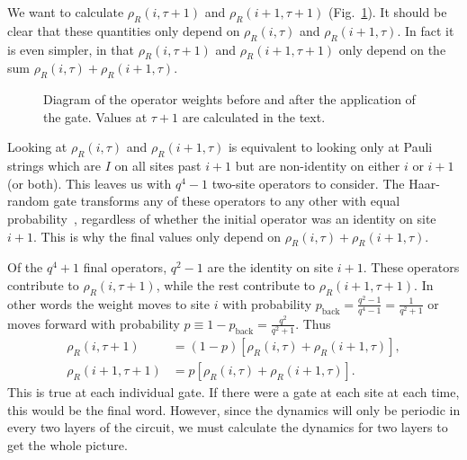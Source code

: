 \documentclass[a4paper,11pt]{article}
\renewcommand{\th}[1]{\frac{1}{#1}}
\renewcommand{\t}{\tau}
\newcommand{\nn}{\nonumber\\}
\begin{document}
We want to calculate $\rho_R(i,\tau+1)$ and $\rho_R(i+1, \tau+1)$ (Fig.~\ref{fig:2sites}). It should be clear that these quantities only depend on $\rho_R(i,\tau)$ and $\rho_R(i+1, \tau)$. In fact it is even simpler, in that $\rho_R(i,\tau+1)$ and $\rho_R(i+1, \tau+1)$ only depend on the sum $\rho_R(i,\tau) + \rho_R(i+1, \tau)$. 

\begin{figure}
	\centering
	
	\caption{Diagram of the operator weights before and after the application of the gate. Values at $\t+1$ are calculated in the text.}
	\label{fig:2sites}
\end{figure}

Looking at $\rho_R(i,\tau)$ and $\rho_R(i+1, \tau)$ is equivalent to looking only at Pauli strings which are $I$ on all sites past $i+1$ but are non-identity on either $i$ or $i+1$ (or both).
This leaves us with $q^4-1$ two-site operators to consider. The Haar-random gate transforms any of these operators to any other with equal probability~\cite{BrownScrambling}, regardless of whether the initial operator was an identity on site $i+1$. This is why the final values only depend on $\rho_R(i,\tau) + \rho_R(i+1, \tau)$.

Of the $q^4+1$ final operators, $q^2-1$ are the identity on site $i+1$. These operators contribute to $\rho_R(i,\tau+1)$, while the rest contribute to $\rho_R(i+1, \tau+1)$. In other words the weight moves to site $i$ with probability $p_\text{back} = \frac{q^2-1}{q^4-1} = \th{q^2+1}$ or moves forward with probability $p\equiv 1- p_\text{back} = \frac{q^2}{q^2+1}$. Thus
\begin{align}
\rho_R(i,  \t+1) &= (1-p)\left[\rho_R(i,\t)+\rho_R(i+1,\t)\right],\nn
\rho_R(i+1,\t+1) &=    p \left[\rho_R(i,\t)+\rho_R(i+1,\t)\right].
\end{align}
This is true at each individual gate. If there were a gate at each site at each time, this would be the final word. However, since the dynamics will only be periodic in every two layers of the circuit, we must calculate the dynamics for two layers to get the whole picture.
\end{document}
